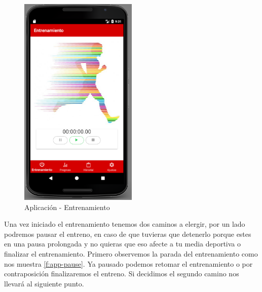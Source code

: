 \documentclass[a4paper, 11pt]{article}
\begin{document}
\begin{itemize}
          \begin{figure}[H]
           \centering
           \includegraphics[width=0.5\textwidth]{2entrenamiento}
           \caption{Aplicación - Entrenamiento}
           \label{f:app-entrenamiento}
          \end{figure}

  Una vez iniciado el entrenamiento tenemos dos caminos a elergir, por un lado podremos pausar
  el entreno, en caso de que tuvieras que detenerlo porque estes en una pausa prolongada y no quieras
  que eso afecte a tu media deportiva o finalizar el entrenamiento. Primero observemos la parada del
  entrenamiento como nos muestra \ref{f:app-pause}. Ya pausado podemos retomar el entrenamiento o
  por contraposición finalizaremos el entreno. Si decidimos el segundo camino nos llevará al siguiente
  punto.\\



\end{itemize}
\end{document}
